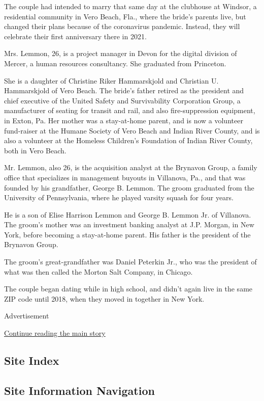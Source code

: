 The couple had intended to marry that same day at the clubhouse at
Windsor, a residential community in Vero Beach, Fla., where the bride's
parents live, but changed their plans because of the coronavirus
pandemic. Instead, they will celebrate their first anniversary there in
2021.

Mrs. Lemmon, 26, is a project manager in Devon for the digital division
of Mercer, a human resources consultancy. She graduated from Princeton.

She is a daughter of Christine Riker Hammarskjold and Christian U.
Hammarskjold of Vero Beach. The bride's father retired as the president
and chief executive of the United Safety and Survivability Corporation
Group, a manufacturer of seating for transit and rail, and also
fire-suppression equipment, in Exton, Pa. Her mother was a stay-at-home
parent, and is now a volunteer fund-raiser at the Humane Society of Vero
Beach and Indian River County, and is also a volunteer at the Homeless
Children's Foundation of Indian River County, both in Vero Beach.

Mr. Lemmon, also 26, is the acquisition analyst at the Brynavon Group, a
family office that specializes in management buyouts in Villanova, Pa.,
and that was founded by his grandfather, George B. Lemmon. The groom
graduated from the University of Pennsylvania, where he played varsity
squash for four years.

He is a son of Elise Harrison Lemmon and George B. Lemmon Jr. of
Villanova. The groom's mother was an investment banking analyst at J.P.
Morgan, in New York, before becoming a stay-at-home parent. His father
is the president of the Brynavon Group.

The groom's great-grandfather was Daniel Peterkin Jr., who was the
president of what was then called the Morton Salt Company, in Chicago.

The couple began dating while in high school, and didn't again live in
the same ZIP code until 2018, when they moved in together in New York.

Advertisement

\protect\hyperlink{after-bottom}{Continue reading the main story}

\hypertarget{site-index}{%
\subsection{Site Index}\label{site-index}}

\hypertarget{site-information-navigation}{%
\subsection{Site Information
Navigation}\label{site-information-navigation}}

